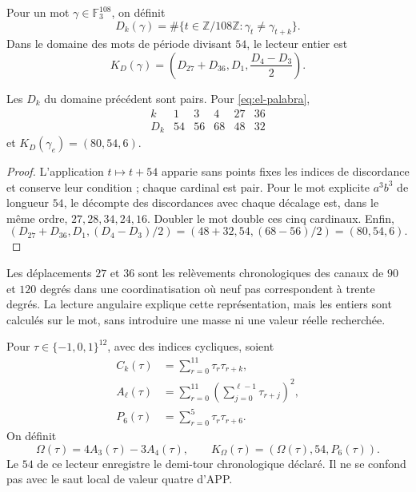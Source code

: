 

\begin{definition}
Pour un mot \(\gamma\in\mathbb F_3^{108}\), on définit
\[
 D_k(\gamma)=\#\{t\in\mathbb Z/108\mathbb Z:
                   \gamma_t\ne\gamma_{t+k}\}.
\]
Dans le domaine des mots de période divisant \(54\), le lecteur entier est
\begin{equation}
 K_D(\gamma)=\left(D_{27}+D_{36},D_1,\frac{D_4-D_3}{2}\right).
 \label{eq:el-kd}
\end{equation}
\end{definition}

\begin{lemma}
Les \(D_k\) du domaine précédent sont pairs. Pour
\eqref{eq:el-palabra},
\[
 \begin{array}{c|rrrrr}
 k&1&3&4&27&36\\\hline
 D_k&54&56&68&48&32
 \end{array}
\]
et \(K_D(\gamma_e)=(80,54,6)\).
\end{lemma}
\begin{proof}
L'application \(t\mapsto t+54\) apparie sans points fixes les indices de discordance et conserve leur condition ; chaque cardinal est pair. Pour le mot explicite \(a^3b^3\) de longueur \(54\), le décompte des discordances avec chaque décalage est, dans le même ordre, \(27,28,34,24,16\). Doubler le mot double ces cinq cardinaux. Enfin,
\[
 (D_{27}+D_{36},D_1,(D_4-D_3)/2)
 =(48+32,54,(68-56)/2)=(80,54,6).
\]
\end{proof}

Les déplacements \(27\) et \(36\) sont les relèvements
chronologiques des canaux de \(90\) et \(120\) degrés dans une coordinatisation
où neuf pas correspondent à trente degrés. La lecture angulaire
explique cette représentation, mais les entiers sont calculés sur le
mot, sans introduire une masse ni une valeur réelle recherchée.

\begin{definition}
Pour \(\tau\in\{-1,0,1\}^{12}\), avec des indices cycliques, soient
\begin{align*}
 C_k(\tau)&=\sum_{r=0}^{11}\tau_r\tau_{r+k},\\
 A_\ell(\tau)&=\sum_{r=0}^{11}
           \left(\sum_{j=0}^{\ell-1}\tau_{r+j}\right)^2,\\
 P_6(\tau)&=\sum_{r=0}^{5}\tau_r\tau_{r+6}.
\end{align*}
On définit
\begin{equation}
 \Omega(\tau)=4A_3(\tau)-3A_4(\tau),\qquad
 K_\Omega(\tau)=(\Omega(\tau),54,P_6(\tau)).
 \label{eq:el-komega}
\end{equation}
Le \(54\) de ce lecteur enregistre le demi-tour chronologique déclaré.
Il ne se confond pas avec le saut local de valeur quatre d'APP.
\end{definition}

